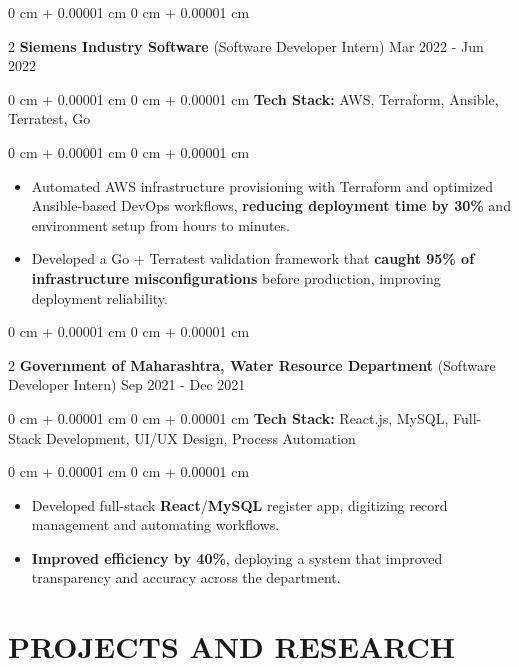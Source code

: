 \documentclass[9pt, letterpaper]{article}
\newenvironment{highlights}{
    \begin{itemize}[
        topsep=0.05 cm,
        parsep=0 pt,
        partopsep=0pt,
        itemsep=0pt,
        leftmargin=10pt
    ]
}{
    \end{itemize}
} %
\newenvironment{onecolentry}{
    \begin{adjustwidth}{
        0 cm + 0.00001 cm}{
        0 cm + 0.00001 cm}
}{
    \end{adjustwidth}
} %
\newenvironment{twocolentry}[2][]{
    \onecolentry
    \def\secondColumn{#2}
    \setcolumnwidth{\fill, 4.5 cm}
    \begin{paracol}{2}
}{
    \switchcolumn \raggedleft \secondColumn
    \end{paracol}
    \endonecolentry
} %
\begin{document}
    \begin{twocolentry}{Mar 2022 - Jun 2022}\textbf{Siemens Industry Software} (Software Developer Intern)\end{twocolentry}
    \begin{onecolentry}\textbf{Tech Stack:} AWS, Terraform, Ansible, Terratest, Go \end{onecolentry}
    \begin{onecolentry}
        \begin{highlights}
            \item Automated AWS infrastructure provisioning with Terraform and optimized Ansible-based DevOps workflows, \textbf{reducing deployment time by 30\%} and environment setup from hours to minutes.
            \item Developed a Go + Terratest validation framework that \textbf{caught 95\% of infrastructure misconfigurations} before production, improving deployment reliability.
        \end{highlights}
    \end{onecolentry}
    \vspace{0.04 cm}

    \begin{twocolentry}{Sep 2021 - Dec 2021}\textbf{Government of Maharashtra, Water Resource Department} (Software Developer Intern)\end{twocolentry}
    \begin{onecolentry}\textbf{Tech Stack:} React.js, MySQL, Full-Stack Development, UI/UX Design, Process Automation \end{onecolentry}
    \begin{onecolentry}
        \begin{highlights}
            \item Developed full-stack \textbf{React}/\textbf{MySQL} register app, digitizing record management and automating workflows.
            \item \textbf{Improved efficiency by 40\%}, deploying a system that improved transparency and accuracy across the department.
        \end{highlights}
    \end{onecolentry}

\section{PROJECTS AND RESEARCH}
\end{document}
